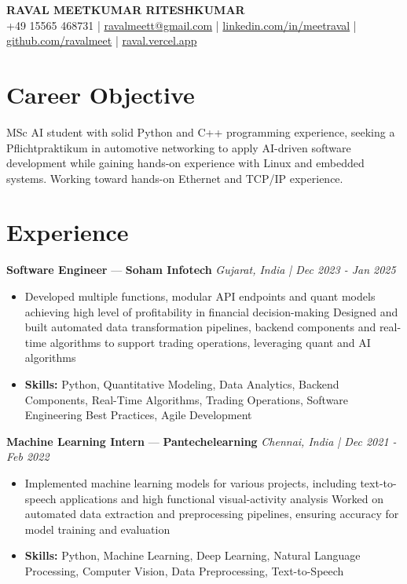\documentclass[a4paper,10pt]{article}
\begin{document}
\begin{center}
  {\Large\bfseries RAVAL MEETKUMAR RITESHKUMAR}\\[2pt]
  {\small +49 15565 468731 \;|\; \href{mailto:ravalmeett@gmail.com}{ravalmeett@gmail.com} \;|\; \href{https://www.linkedin.com/in/meetraval/}{linkedin.com/in/meetraval} \;|\; \href{https://github.com/ravalmeet}{github.com/ravalmeet} \;|\; \href{https://raval.vercel.app/}{raval.vercel.app}}
\end{center}
\vspace{-3pt}

\section*{Career Objective}
MSc AI student with solid Python and C++ programming experience, seeking a Pflichtpraktikum in automotive networking to apply AI-driven software development while gaining hands-on experience with Linux and embedded systems. Working toward hands-on Ethernet and TCP/IP experience.\par

\section*{Experience}
\textbf{Software Engineer} — \textbf{Soham Infotech} \hfill \textit{Gujarat, India \;|\; Dec 2023 - Jan 2025}\par
\vspace{1pt}
\begin{itemize}
  \item Developed multiple functions, modular API endpoints and quant models achieving high level of profitability in financial decision-making Designed and built automated data transformation pipelines, backend components and real-time algorithms to support trading operations, leveraging quant and AI algorithms
  \item \textbf{Skills:} Python, Quantitative Modeling, Data Analytics, Backend Components, Real-Time Algorithms, Trading Operations, Software Engineering Best Practices, Agile Development
\end{itemize}
\vspace{3pt}
\textbf{Machine Learning Intern} — \textbf{Pantechelearning} \hfill \textit{Chennai, India \;|\; Dec 2021 - Feb 2022}\par
\vspace{1pt}
\begin{itemize}
  \item Implemented machine learning models for various projects, including text-to-speech applications and high functional visual-activity analysis Worked on automated data extraction and preprocessing pipelines, ensuring accuracy for model training and evaluation
  \item \textbf{Skills:} Python, Machine Learning, Deep Learning, Natural Language Processing, Computer Vision, Data Preprocessing, Text-to-Speech
\end{itemize}
\end{document}

